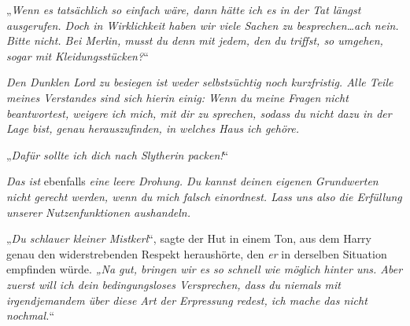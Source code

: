 „\emph{Wenn es tatsächlich so einfach wäre, dann hätte ich es in der Tat längst ausgerufen. Doch in Wirklichkeit haben wir viele Sachen zu besprechen…ach nein. Bitte nicht. Bei Merlin, \emph{musst} du denn mit jedem, den du triffst, so umgehen, sogar mit Kleidungsstücken?}“

\emph{Den Dunklen Lord zu besiegen ist weder selbstsüchtig noch kurzfristig. Alle Teile meines Verstandes sind sich hierin einig: Wenn du meine Fragen nicht beantwortest, weigere ich mich, mit dir zu sprechen, sodass du nicht dazu in der Lage bist, genau herauszufinden, in welches Haus ich gehöre. }

„\emph{Dafür sollte ich dich nach Slytherin packen!}“

\emph{Das ist} ebenfalls \emph{eine leere Drohung. Du kannst deinen eigenen Grundwerten nicht gerecht werden, wenn du mich falsch einordnest. Lass uns also die Erfüllung unserer Nutzenfunktionen aushandeln.}

„\emph{Du schlauer kleiner Mistkerl}“, sagte der Hut in einem Ton, aus dem Harry genau den widerstrebenden Respekt heraushörte, den \emph{er} in derselben Situation empfinden würde. \emph{„Na gut, bringen wir es so schnell wie möglich hinter uns. Aber zuerst will ich dein bedingungsloses Versprechen, dass du niemals mit irgendjemandem über diese Art der Erpressung redest, ich mache das nicht nochmal.}“

